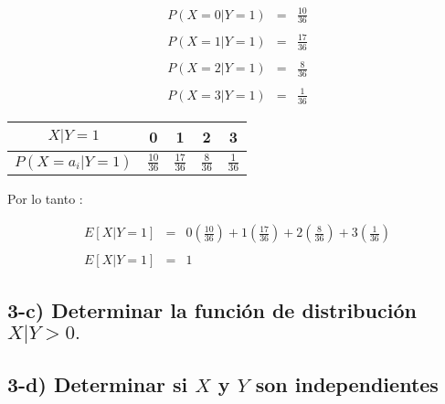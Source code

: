 \documentclass[12pt]{article}
\begin{document}
\begin{equation*}
    \begin{array}{rcl}
        P\left(X = 0|Y = 1\right) & = & \displaystyle \frac{10}{36}
        \\
        \\
        P\left(X = 1|Y = 1\right) & = & \displaystyle \frac{17}{36}
        \\
        \\
        P\left(X = 2|Y = 1\right) & = & \displaystyle \frac{8}{36}
        \\
        \\
        P\left(X = 3|Y = 1\right) & = & \displaystyle \frac{1}{36}
    \end{array}
\end{equation*}


\begin{center}
    \renewcommand{\arraystretch}{1.5}
    \begin{tabular}{|c|c|c|c|c|}
        \hline
        $X|Y = 1$                      & 0               & 1               & 2              & 3
        \\
        \hline
        $P\left(X = a_i| Y = 1\right)$ & $\frac{10}{36}$ & $\frac{17}{36}$ & $\frac{8}{36}$ & $\frac{1}{36}$
        \\
        \hline
    \end{tabular}
\end{center}


Por lo tanto :

\begin{equation*}
    \begin{array}{rcl}
        E[X|Y = 1] & = & \displaystyle 0  \left(\frac{10}{36}\right) + 1 \left(\frac{17}{36} \right) + 2 \left(\frac{8}{36}\right)  + 3 \left( \frac{1}{36} \right)
        \\
        \\
        E[X|Y = 1] & = & 1
    \end{array}
\end{equation*}

\subsection*{3-c) Determinar la funci\'on de distribuci\'on $ X | Y > 0.$}


\subsection*{3-d) Determinar si $X$ y $Y$ son independientes}
\end{document}
